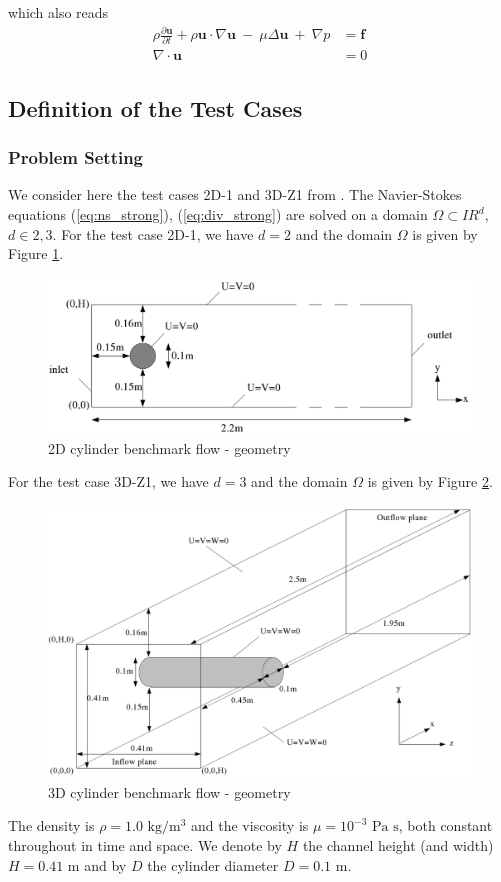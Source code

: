 \documentclass[11pt,a4paper]{article}
\newcommand{\IR}{I\!\!R}
\renewcommand{\vec}[1]{\boldsymbol{#1}}
\newcommand{\eref}[1]{(\ref{#1})}
\begin{document}
which also reads
\begin{eqnarray}
  \rho \frac{\partial \vec{u} }{\partial t} + \rho \vec{u} \cdot \nabla \vec{u}\ -\ \mu \Delta \vec{u}\ +\ \nabla p  & = \vec{f}   \label{eq:5}\\
  \nabla \cdot \vec{u} & = 0\label{eq:6}
\end{eqnarray}




\subsection{Definition of the Test Cases}

\subsubsection{Problem Setting}

We consider here the test cases 2D-1 and 3D-Z1 from \cite{schaefer:1996}.
The Navier-Stokes equations \eref{eq:ns_strong}, \eref{eq:div_strong} are solved on a domain $\Omega\subset\IR^{d}$, $d\in{2,3}$.
For the test case 2D-1, we have $d=2$ and the domain $\Omega$ is given by Figure \ref{fig:cyl_geom_2d}.
\begin{figure}[!htbp]
\begin{center}
\includegraphics[width=0.75 \textwidth]{figures/cylinder2d_geom}
\caption{2D cylinder benchmark flow - geometry}
\label{fig:cyl_geom_2d}
\end{center}
\end{figure}
For the test case 3D-Z1, we have $d=3$ and the domain $\Omega$ is given by Figure \ref{fig:cyl_geom_3d}.
\begin{figure}[!htbp]
\begin{center}
\includegraphics[width=0.75 \textwidth]{figures/cylinder_geom}
\caption{3D cylinder benchmark flow - geometry}
\label{fig:cyl_geom_3d}
\end{center}
\end{figure}
The density is $\rho=1.0\mbox{ kg}/\mbox{m}^3$ and the viscosity is
$\mu=10^{-3}\mbox{ Pa s}$, both constant throughout in time and space.
We denote by $H$ the channel height (and width) $H=0.41\mbox{ m}$ and
by $D$ the cylinder diameter $D=0.1\mbox{ m}$.
\end{document}
